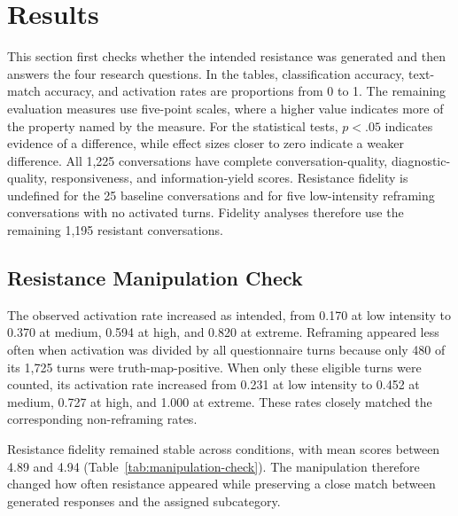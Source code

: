 \section{Results}\label{s:results}

This section first checks whether the intended resistance was generated and then answers the four research questions. In the tables, classification accuracy, text-match accuracy, and activation rates are proportions from 0 to 1. The remaining evaluation measures use five-point scales, where a higher value indicates more of the property named by the measure. For the statistical tests, $p<.05$ indicates evidence of a difference, while effect sizes closer to zero indicate a weaker difference. All 1,225 conversations have complete conversation-quality, diagnostic-quality, responsiveness, and information-yield scores. Resistance fidelity is undefined for the 25 baseline conversations and for five low-intensity reframing conversations with no activated turns. Fidelity analyses therefore use the remaining 1,195 resistant conversations.

\subsection{Resistance Manipulation Check}

The observed activation rate increased as intended, from 0.170 at low intensity to 0.370 at medium, 0.594 at high, and 0.820 at extreme. Reframing appeared less often when activation was divided by all questionnaire turns because only 480 of its 1,725 turns were truth-map-positive. When only these eligible turns were counted, its activation rate increased from 0.231 at low intensity to 0.452 at medium, 0.727 at high, and 1.000 at extreme. These rates closely matched the corresponding non-reframing rates.

Resistance fidelity remained stable across conditions, with mean scores between 4.89 and 4.94 (Table~\ref{tab:manipulation-check}). The manipulation therefore changed how often resistance appeared while preserving a close match between generated responses and the assigned subcategory.

\begin{table}[t]
\centering
\caption{Observed activation rates and resistance fidelity by intensity.}
\label{tab:manipulation-check}
\end{table}

